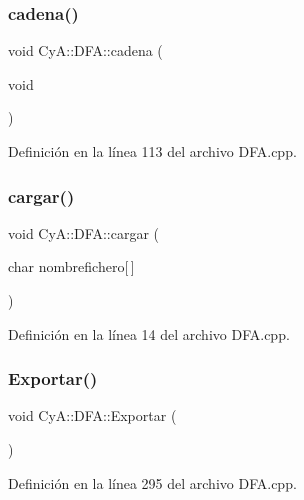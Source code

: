 \subsubsection{\texorpdfstring{cadena()}{cadena()}}
{\footnotesize\ttfamily void Cy\+A\+::\+D\+F\+A\+::cadena (\begin{DoxyParamCaption}\item[{void}]{ }\end{DoxyParamCaption})}



Definición en la línea 113 del archivo D\+F\+A.\+cpp.

\mbox{\label{class_cy_a_1_1_d_f_a_a753f99c6d3e61fcb7035814e216002d0}} 
\subsubsection{\texorpdfstring{cargar()}{cargar()}}
{\footnotesize\ttfamily void Cy\+A\+::\+D\+F\+A\+::cargar (\begin{DoxyParamCaption}\item[{char}]{nombrefichero\mbox{[}$\,$\mbox{]} }\end{DoxyParamCaption})}



Definición en la línea 14 del archivo D\+F\+A.\+cpp.

\mbox{\label{class_cy_a_1_1_d_f_a_aee627abe4a51a332549ae67059591967}} 
\subsubsection{\texorpdfstring{Exportar()}{Exportar()}}
{\footnotesize\ttfamily void Cy\+A\+::\+D\+F\+A\+::\+Exportar (\begin{DoxyParamCaption}{ }\end{DoxyParamCaption})}



Definición en la línea 295 del archivo D\+F\+A.\+cpp.

\mbox{\label{class_cy_a_1_1_d_f_a_a999e0a396be747ab466bf4a8c97230d2}} 

